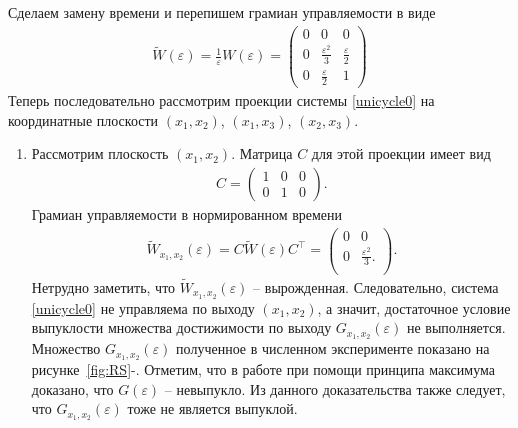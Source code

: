 \documentclass[../main.tex]{subfiles}
\begin{document}
    Сделаем замену времени и перепишем грамиан управляемости в виде
    \begin{gather*}
        \widetilde{W}(\varepsilon) = \frac{1}{\varepsilon}W(\varepsilon)     =\begin{pmatrix}
            0 & 0 & 0 \\
            0 & \frac{\varepsilon^2}{3} & \frac{\varepsilon}{2} \\
            0 &  \frac{\varepsilon}{2} & 1
        \end{pmatrix} 
    \end{gather*} 
    Теперь последовательно рассмотрим проекции системы \eqref{unicycle0} на координатные плоскости $ (x_1, x_2) $, $ (x_1, x_3) $, $ (x_2, x_3) $. \\
    
    \begin{enumerate}
        \item Рассмотрим плоскость $ (x_1, x_2) $. Матрица $ C $ для этой проекции имеет вид
        \begin{gather*}
            C = \begin{pmatrix}
                1 & 0 & 0 \\
                0 & 1 & 0
            \end{pmatrix}.
        \end{gather*}
        Грамиан управляемости в нормированном времени
        \begin{gather*}
            \widetilde{W}_{x_1,x_2}(\varepsilon) =  C \widetilde{W} (\varepsilon) C^{\top}  =\begin{pmatrix}
                0 & 0 \\
                0 & \frac{\varepsilon^2}{3}. \\
            \end{pmatrix}.
        \end{gather*}
        Нетрудно заметить, что $ \widetilde{W}_{x_1,x_2}(\varepsilon) $ -- вырожденная. Следовательно, система \eqref{unicycle0} не управляема по выходу $ (x_1, x_2) $, а значит, достаточное условие выпуклости множества достижимости по выходу $ G_{x_1,x_2}(\varepsilon) $ не выполняется. Множество $ G_{x_1,x_2}(\varepsilon) $ полученное в численном эксперименте показано на рисунке~\ref{fig:RS}-. Отметим, что в работе \cite{GusevOsipovTrudy} при помощи принципа максимума доказано, что $ G(\varepsilon) $ -- невыпукло. Из данного доказательства также следует, что $ G_{x_1,x_2}(\varepsilon) $ тоже не является выпуклой.
        

\end{enumerate}
\end{document}
